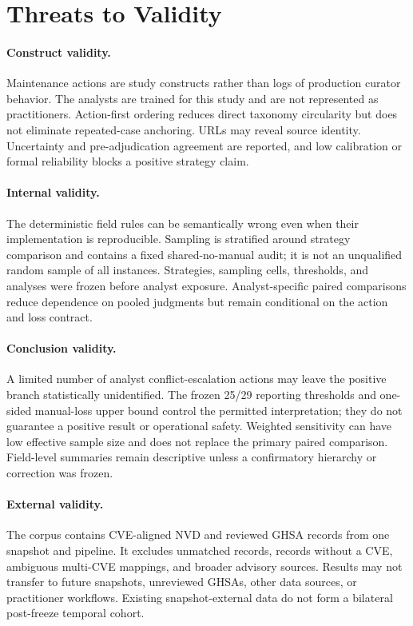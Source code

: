\documentclass[preprint,review,12pt,authoryear]{elsarticle}
\begin{document}
\section{Threats to Validity}
\label{sec:threats}

\paragraph{Construct validity.}
Maintenance actions are study constructs rather than logs of production curator
behavior. The analysts are trained for this study and are not represented as
practitioners. Action-first ordering reduces direct taxonomy circularity but
does not eliminate repeated-case anchoring. URLs may reveal source identity.
Uncertainty and pre-adjudication agreement are reported, and low calibration or
formal reliability blocks a positive strategy claim.

\paragraph{Internal validity.}
The deterministic field rules can be semantically wrong even when their
implementation is reproducible. Sampling is stratified around strategy
comparison and contains a fixed shared-no-manual audit; it is not an
unqualified random sample of all instances. Strategies, sampling cells,
thresholds, and analyses were frozen before analyst exposure. Analyst-specific
paired comparisons reduce dependence on pooled judgments but remain conditional
on the action and loss contract.

\paragraph{Conclusion validity.}
A limited number of analyst conflict-escalation actions may leave the positive
branch statistically unidentified. The frozen 25/29 reporting thresholds and
one-sided manual-loss upper bound control the permitted interpretation; they do
not guarantee a positive result or operational safety. Weighted sensitivity can
have low effective sample size and does not replace the primary paired
comparison. Field-level summaries remain descriptive unless a confirmatory
hierarchy or correction was frozen.

\paragraph{External validity.}
The corpus contains CVE-aligned NVD and reviewed GHSA records from one snapshot
and pipeline. It excludes unmatched records, records without a CVE, ambiguous
multi-CVE mappings, and broader advisory sources. Results may not transfer to
future snapshots, unreviewed GHSAs, other data sources, or practitioner
workflows. Existing snapshot-external data do not form a bilateral post-freeze
temporal cohort.
\end{document}
